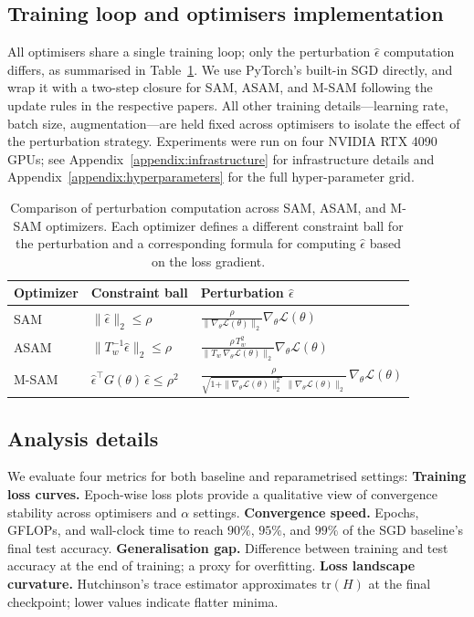 \documentclass{article}
\begin{document}
\subsection{Training loop and optimisers implementation}
All optimisers share a single training loop; only the perturbation $\hat{\epsilon}$ computation differs, as summarised in Table~\ref{tab:perturbations}. We use PyTorch's built-in SGD directly, and wrap it with a two-step closure for SAM, ASAM, and M-SAM following the update rules in the respective papers. All other training details—learning rate, batch size, augmentation—are held fixed across optimisers to isolate the effect of the perturbation strategy. Experiments were run on four NVIDIA RTX 4090 GPUs; see Appendix~\ref{appendix:infrastructure} for infrastructure details and Appendix~\ref{appendix:hyperparameters} for the full hyper-parameter grid.

\begin{table}[H]
\centering
\caption{Comparison of perturbation computation across SAM, ASAM, and M-SAM optimizers. Each optimizer defines a different constraint ball for the perturbation and a corresponding formula for computing $\hat{\epsilon}$ based on the loss gradient.}
\label{tab:perturbations}
\begin{tabular}{lll}
\toprule
\textbf{Optimizer} & \textbf{Constraint ball} & \textbf{Perturbation $\hat{\epsilon}$} \\
\midrule
SAM & $\|\hat{\epsilon}\|_2 \le \rho$ &
  $\displaystyle\frac{\rho}{\|\nabla_\theta\mathcal{L}(\theta)\|_2} \nabla_\theta\mathcal{L}(\theta) $ \\[10pt]
ASAM & $\|T_w^{-1}\hat{\epsilon}\|_2 \le \rho$ &
  $\displaystyle \frac{\rho \,T_w^2}{\|T_w\,\nabla_\theta\mathcal{L}(\theta)\|_2} \nabla_\theta\mathcal{L}(\theta)$ \\[10pt]
M-SAM & $\hat{\epsilon}^\top G(\theta)\,\hat{\epsilon} \le \rho^2$ &
  $\displaystyle\frac{\rho}{\sqrt{1+\|\nabla_\theta\mathcal{L}(\theta)\|_2^2}\;\|\nabla_\theta\mathcal{L}(\theta)\|_2}\,\nabla_\theta\mathcal{L}(\theta)$ \\
\bottomrule
\end{tabular}
\end{table}

\subsection{Analysis details}

We evaluate four metrics for both baseline and reparametrised settings:
\textbf{Training loss curves.} Epoch-wise loss plots provide a qualitative view of convergence stability across optimisers and $\alpha$ settings. \textbf{Convergence speed.} Epochs, GFLOPs, and wall-clock time to reach $90\%$, $95\%$, and $99\%$ of the SGD baseline's final test accuracy. \textbf{Generalisation gap.} Difference between training and test accuracy at the end of training; a proxy for overfitting. \textbf{Loss landscape curvature.} Hutchinson's trace estimator approximates $\mathrm{tr}(H)$ at the final checkpoint; lower values indicate flatter minima.
\end{document}
